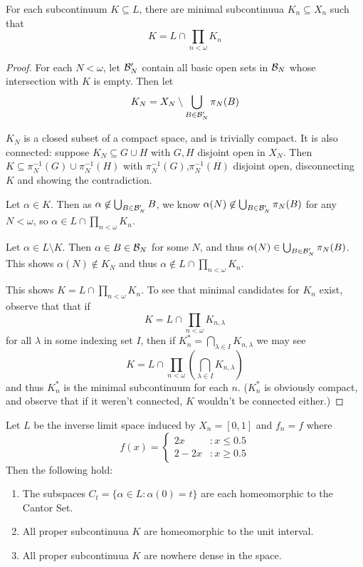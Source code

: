 \begin{lemma}\label{subcontinuua}
  For each subcontinuum $K\subseteq L$, there are minimal subcontinuua $K_n\subseteq X_n$ such that
    \[
      K = L \cap \prod_{n<\omega} K_n
    \]
\end{lemma}

\begin{proof}
  For each $N<\omega$, let $\mathcal{B}'_N$ contain all basic open sets in $\mathcal{B}_N$ whose intersection with $K$ is empty. Then let 
    \[
      K_N = X_N \setminus \bigcup_{B\in\mathcal{B}'_N} \pi_N(B)
    \]

  $K_N$ is a closed subset of a compact space, and is trivially compact. It is also connected: suppose $K_N\subseteq G\cup H$ with $G,H$ disjoint open in $X_N$. Then $K\subseteq \pi_N^{-1}(G)\cup\pi_N^{-1}(H)$ with $\pi_N^{-1}(G)$,$\pi_N^{-1}(H)$ disjoint open, disconnecting $K$ and showing the contradiction.

  Let $\alpha\in K$. Then as $\alpha\not\in \bigcup_{B\in\mathcal{B}'_N} B$, we know $\alpha(N)\not\in \bigcup_{B\in\mathcal{B}'_N} \pi_N(B)$ for any $N<\omega$, so $\alpha \in L \cap \prod_{n<\omega} K_n$.

  Let $\alpha\in L\setminus K$. Then $\alpha\in B \in \mathcal{B}_N$ for some $N$, and thus $\alpha(N)\in \bigcup_{B\in\mathcal{B}'_N} \pi_N(B)$. This shows $\alpha(N)\not\in K_N$ and thus $\alpha \not\in L \cap \prod_{n<\omega} K_n$.

  This shows $K = L \cap \prod_{n<\omega} K_n$. To see that minimal candidates for $K_n$ exist, observe that that if
    \[
      K = L \cap \prod_{n<\omega} K_{n,\lambda}
    \]
  for all $\lambda$ in some indexing set $I$, then if $K^*_n = \bigcap_{\lambda\in I} K_{n,\lambda}$ we may see
    \[
      K = L \cap \prod_{n<\omega} \left(\bigcap_{\lambda\in I} K_{n,\lambda}\right)
    \]
  and thus $K^*_n$ is the minimal subcontinuum for each $n$. ($K^*_n$ is obviously compact, and observe that if it weren't connected, $K$ wouldn't be connected either.)
\end{proof}

\begin{example}
Let $L$ be the inverse limit space induced by $X_n=[0,1]$ and $f_n=f$ where
\[
  f(x) = \left\{
     \begin{array}{lr}
       2x & : x \leq 0.5 \\
       2-2x & : x \geq 0.5
     \end{array}
   \right.
\]
Then the following hold:
  \begin{enumerate}
    \item The subspaces $C_t = \{\alpha\in L : \alpha(0)=t\}$ are each homeomorphic to the Cantor Set.
    \item All proper subcontinuua $K$ are homeomorphic to the unit interval.
    \item All proper subcontinuua $K$ are nowhere dense in the space.
  \end{enumerate}
\end{example}

